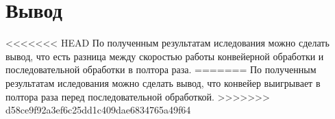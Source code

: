 \section{Вывод}
<<<<<<< HEAD
По полученным результатам иследования можно сделать вывод, что есть разница между скоростью работы конвейерной обработки и последовательной обработки в полтора раза.
=======
По полученным результатам иследования можно сделать вывод, что конвейер выигрывает в полтора раза перед последовательной обработкой.
>>>>>>> d58ce9f92a3ef6c25dd1c409dae6834765a49f64

